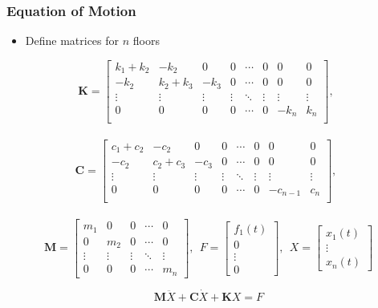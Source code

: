 \documentclass[xcolor=svgnames,9pt]{beamer}
\theoremstyle{remark}
\begin{document}
		\begin{frame}
  			\frametitle{Equation of Motion}
			\begin{itemize}
				\item Define matrices for $n$ floors
			\end{itemize}

				\begin{equation*}
					\textbf{K}=
					\begin{bmatrix}
						k_1 + k_2 & -k_2 & 0 & 0 & \cdots & 0 & 0 & 0\\
						-k_2 & k_2 + k_3 & -k_3 & 0 & \cdots & 0 & 0 & 0\\
						\vdots & \vdots & \vdots & \vdots & \ddots & \vdots & \vdots & \vdots \\
						0& 0 & 0 & 0 & \cdots & 0 & -k_{n} & k_{n}\\
					\end{bmatrix},\ \ 
				\end{equation*}\\

				\begin{equation*}
					\textbf{C}=
					\begin{bmatrix}
					           c_1 + c_2 & -c_2 & 0 & 0 & \cdots & 0 & 0 & 0\\
						-c_2 &  c_2 + c_3 & -c_3 & 0 & \cdots & 0 & 0 & 0\\
						\vdots & \vdots & \vdots & \vdots & \ddots & \vdots & \vdots & \vdots \\
						0& 0 & 0 & 0 & \cdots & 0 &-c_{n-1} & c_{n}\\ 
					\end{bmatrix},\ \ 
				\end{equation*}\\

				\begin{equation*}
					\textbf{M}=
					\begin{bmatrix}
						m_1 & 0 & 0 & \cdots & 0\\
						0 & m_2 & 0 & \cdots & 0\\
						\vdots & \vdots & \vdots & \ddots & \vdots \\
						0 & 0 & 0 & \cdots & m_n
					\end{bmatrix},\ \ 
					F=
					\begin{bmatrix}
						f_1(t)\\
						0\\
						\vdots \\
						0
					\end{bmatrix},\ \
					X=
					\begin{bmatrix}
						x_1(t)\\
						\vdots \\
						x_n(t)
					\end{bmatrix}
				\end{equation*}
				\begin{framed}
					\begin{equation}\label{MotionEQ}
						\textbf{M}\ddot{X}+\textbf{C}\dot{X}+\textbf{K}X = F
					\end{equation}
				\end{framed}
		\end{frame}
\end{document}

